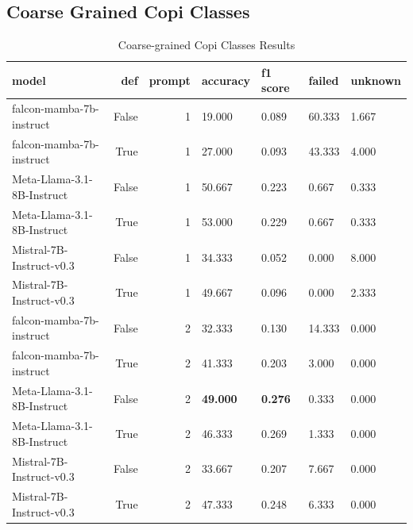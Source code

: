 \subsection{ Coarse Grained Copi Classes}
\begin{table}[H]
\centering
\caption{Coarse-grained Copi Classes Results}
\begin{tabular}{lrrllll}
\toprule
model & def & prompt & accuracy & f1 score & failed & unknown \\
\midrule
falcon-mamba-7b-instruct & False & 1 & 19.000 & 0.089 & 60.333 & 1.667 \\
falcon-mamba-7b-instruct & True & 1 & 27.000 & 0.093 & 43.333 & 4.000 \\
Meta-Llama-3.1-8B-Instruct & False & 1 & 50.667 & 0.223 & 0.667 & 0.333 \\
Meta-Llama-3.1-8B-Instruct & True & 1 & 53.000 & 0.229 & 0.667 & 0.333 \\
Mistral-7B-Instruct-v0.3 & False & 1 & 34.333 & 0.052 & 0.000 & 8.000 \\
Mistral-7B-Instruct-v0.3 & True & 1 & 49.667 & 0.096 & 0.000 & 2.333 \\
falcon-mamba-7b-instruct & False & 2 & 32.333 & 0.130 & 14.333 & 0.000 \\
falcon-mamba-7b-instruct & True & 2 & 41.333 & 0.203 & 3.000 & 0.000 \\
Meta-Llama-3.1-8B-Instruct & False & 2 & \textbf{49.000} & \textbf{0.276} & 0.333 & 0.000 \\
Meta-Llama-3.1-8B-Instruct & True & 2 & 46.333 & 0.269 & 1.333 & 0.000 \\
Mistral-7B-Instruct-v0.3 & False & 2 & 33.667 & 0.207 & 7.667 & 0.000 \\
Mistral-7B-Instruct-v0.3 & True & 2 & 47.333 & 0.248 & 6.333 & 0.000 \\
\bottomrule
\end{tabular}
\end{table}



